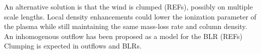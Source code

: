\documentclass[useAMS,usenatbib]{mn2e_x}
\begin{document}
An alternative solution is that the wind is clumped (REFs), possibly on multiple scale lengths.
Local density enhancements could lower the ionization parameter of the plasma
while still maintaining the same mass-loss rate and column density. 
An inhomogenous outflow has been proposed as a model for the BLR (REFs)
Clumping is expected in outflows and BLRs.



\end{document}
